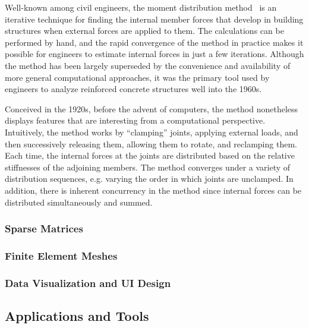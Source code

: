 \documentclass[../../proposal.tex]{subfiles}
\begin{document}
Well-known among civil engineers, the moment distribution method~\cite{} is an iterative technique for finding the internal member forces that develop in building structures when external forces are applied to them.  The calculations can be performed by hand, and the rapid convergence of the method in practice makes it possible for engineers to estimate internal forces in just a few iterations.  Although the method has been largely superseded by the convenience and availability of more general computational approaches, it was the primary tool used by engineers to analyze reinforced concrete structures well into the 1960s.

Conceived in the 1920s, before the advent of computers, the method nonetheless displays features that are interesting from a computational perspective.  Intuitively, the method works by ``clamping'' joints, applying external loads, and then successively releasing them, allowing them to rotate, and reclamping them. Each time, the internal forces at the joints are distributed based on the relative stiffnesses of the adjoining members.  The method converges under a variety of distribution sequences, e.g. varying the order in which joints are unclamped.  In addition, there is inherent concurrency in the method since internal forces can be distributed simultaneously and summed.

\subsubsection{Sparse Matrices}

\subsubsection{Finite Element Meshes}

\subsubsection{Data Visualization and UI Design}

\subsection{Applications and Tools}
\end{document}
